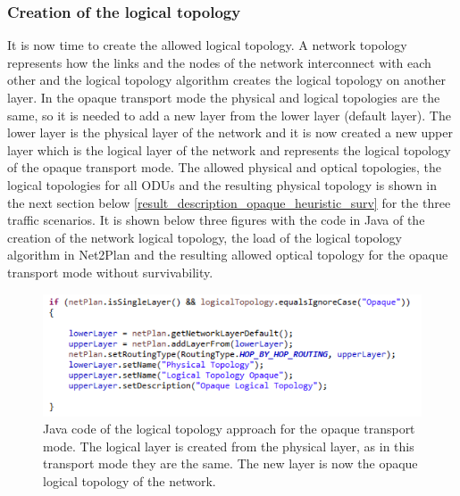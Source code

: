 \subsubsection{Creation of the logical topology}

\vspace{11pt}
It is now time to create the allowed logical topology. A network topology represents how the links and the nodes of the network interconnect with each other and the logical topology algorithm creates the logical topology on another layer. In the opaque transport mode the physical and logical topologies are the same, so it is needed to add a new layer from the lower layer (default layer). The lower layer is the physical layer of the network and it is now created a new upper layer which is the logical layer of the network and represents the logical topology of the opaque transport mode. The allowed physical and optical topologies, the logical topologies for all ODUs and the resulting physical topology is shown in the next section below \ref{result_description_opaque_heuristic_surv} for the three traffic scenarios. It is shown below three figures with the code in Java of the creation of the network logical topology, the load of the logical topology algorithm in Net2Plan and the resulting allowed optical topology for the opaque transport mode without survivability.

\begin{figure}[H]
\centering
\includegraphics[width=15cm]{sdf/heuristic/opaque/figures/logical_topology_creation_opaque}
\caption{Java code of the logical topology approach for the opaque transport mode. The logical layer is created from the physical layer, as in this transport mode they are the same. The new layer is now the opaque logical topology of the network.}
\label{logical_topology_creation_opaque_surv}
\end{figure}

